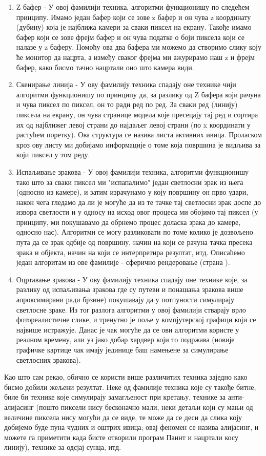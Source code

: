 \documentclass[12pt]{article}
\begin{document}
	\begin{enumerate}
	\item Z бафер - У овој фамилији техника, алгоритми функционишу по следећем принципу. Имамо један бафер који се зове z бафер и он чува z координату (дубину) која је најближа камери за сваки пиксел на екрану. Такође имамо бафер који се зове фрејм бафер и он чува податке о боји пиксела који се налазе у z баферу. Помоћу ова два бафера ми можемо да створимо слику коју ће монитор да нацрта, а између сваког фрејма ми ажурирамо наш z и фрејм бафер, како бисмо тачно нацртали оно што камера види.
	\item Скенирање линија - У ову фамилију техника спадају оне технике чији алгоритми функционишу по принципу да, за разлику од Z бафера који рачуна и чува пиксел по пиксел, он то ради ред по ред. За сваки ред (линију) пиксела на екрану, он чува странице модела које пресецају тај ред и сортира их од најближег левој страни до најдаљег левој страни (по x координати у растућем поретку). Ова структура се назива листа активних ивица. Проласком кроз ову листу ми добијамо информације о томе која површина је видљива за који пиксел у том реду.
	\item Испаљивање зракова - У овој фамилији техника, алгоритми функционишу тако што за сваки пиксел ми "испапалимо" један светлосни зрак из њега (односно из камере), и затим израчунамо у коју површину он прво удари, након чега гледамо да ли је могуће да из те тачке тај светлосни зрак доспе до извора светлости и у односу на исход овог процеса ми обојимо тај пиксел (у принципу, ми покушавамо да обрнемо процес доласка зрака до камере, односно нас). Алгоритми се могу разликовати по томе колико је дозвољено пута да се зрак одбије од површину, начин на који се рачуна тачка пресека зрака и објекта, начин на који се интерпретира резултат, итд. Описаћемо један алгоритам из ове фамилије - сферично рендеровање (страна \pageref{sfericnorenderovanje}).
	\item Оцртавање зракова - У ову фамилију техника спадају оне технике које, за разлику од испаљивања зракова где су путеви и понашања зракова више апроксимирани ради брзине) покушавају да у потпуности симулирају светлосне зраке. Из тог разлога алгоритми у овој фамилији стварају врло фотореалистичне слике, и тренутно је поље у компјутерској графици који се највише истражује. Данас је чак могуће да се ови алгоритми користе у реалном времену, али уз јако добар хардвер који то подржава (новије графичке картице чак имају јединице баш намењене за симулирање светлосних зракова).
	\end{enumerate}
	Као што сам рекао, обично се користи више различитих техника заједно како бисмо добили жељени резултат. Неке од фамилије техника које су такође битне, биле би технике које симулирају замагљеност при кретању, технике за анти-алијасинг (пошто пиксели нису бесконачно мали, неки детаљи који су мањи од величине пиксела нису могући да се виде, те може да се деси да слика коју добијемо буде пуна чудних и оштрих ивица; овај феномен се назива алијасинг, и можете га приметити када бисте отворили програм Паинт и нацртали косу линију), технике за одсјај сунца, итд.
	
\end{document}
